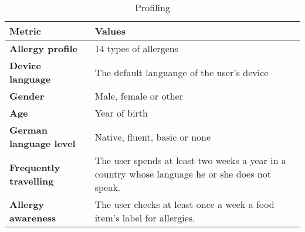 \begin{table}[H]
\centering
\begin{tabular}{p{5cm} p{9.4cm}}
\toprule
Metric & Values\\
\midrule
\textbf{Allergy profile}   &	14 types of allergens  \\
\textbf{Device language}   &	The default languange of the user's device \\
\textbf{Gender}   &	Male, female or other \\
\textbf{Age}   &	Year of birth\\
\textbf{German language level}  &	Native, fluent, basic or none \\
\textbf{Frequently travelling}   &	The user spends at least two weeks a year in a country whose language he or she does not speak. \\
\textbf{Allergy awareness}   &	The user checks at least once a week a food item's label for allergies. \\
\bottomrule
\end{tabular}
\caption{Profiling}
\label{table:user-profiling}
\end{table}